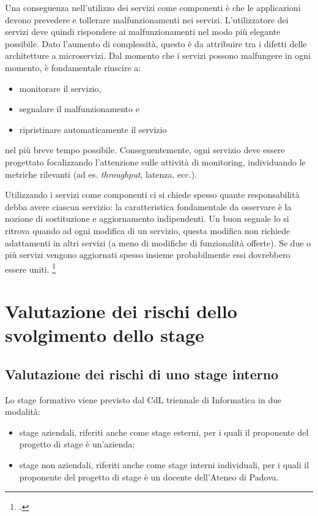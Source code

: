 Una conseguenza nell'utilizzo dei servizi come componenti è che le applicazioni devono prevedere e tollerare malfunzionamenti nei servizi. L'utilizzatore dei servizi deve quindi rispondere ai malfunzionamenti nel modo più elegante possibile. Dato l'aumento di complessità, questo è da attribuire tra i difetti delle architetture a microservizi. Dal momento che i servizi possono malfungere in ogni momento, è fondamentale riuscire a:

\begin{itemize}
  \item monitorare il servizio,
  \item segnalare il malfunzionamento e
  \item ripristinare automaticamente il servizio
\end{itemize}
nel più breve tempo possibile. Conseguentemente, ogni servizio deve essere progettato focalizzando l'attenzione sulle attività di monitoring, individuando le metriche rilevanti (ad es. \emph{throughput}, latenza, ecc.).

Utilizzando i servizi come componenti ci si chiede spesso quante responsabilità debba avere ciascun servizio: la caratteristica fondamentale da osservare è la nozione di sostituzione e aggiornamento indipendenti.
Un buon segnale lo si ritrova quando ad ogni modifica di un servizio, questa modifica non richiede adattamenti in altri servizi (a meno di modifiche di funzionalità offerte).
Se due o più servizi vengono aggiornati spesso insieme probabilmente essi dovrebbero essere uniti.
\footcite{site:fowler-microservices}

\section{Valutazione dei rischi dello svolgimento dello stage}

\subsection{Valutazione dei rischi di uno stage interno}

Lo stage formativo viene previsto dal CdL triennale di Informatica in due modalità:
\begin{itemize}
  \item stage aziendali, riferiti anche come stage esterni, per i quali il proponente del progetto di stage è un'azienda;
  \item stage non aziendali, riferiti anche come stage interni individuali, per i quali il proponente del progetto di stage è un docente dell'Ateneo di Padova.
\end{itemize}


